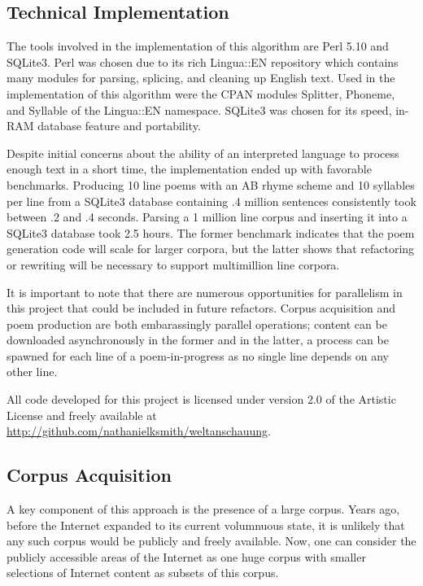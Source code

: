 \documentclass[10pt]{article}
\begin{document}
\subsection{Technical Implementation}
The tools involved in the implementation of this algorithm are Perl
5.10\cite{perl} and SQLite3\cite{sqlite3}. Perl was chosen due to its rich Lingua::EN
repository which contains many modules for parsing, splicing, and cleaning up
English text. Used in the implementation of this algorithm were the CPAN
modules Splitter\cite{splitter}, Phoneme\cite{phoneme}, and
Syllable\cite{syllable} of the Lingua::EN namespace. SQLite3 was
chosen for its speed, in-RAM database feature and portability.

Despite initial concerns about the ability of an interpreted language to
process enough text in a short time, the implementation ended up with favorable
benchmarks. Producing 10 line poems with an AB rhyme scheme and 10 syllables
per line from a SQLite3 database containing .4 million sentences consistently
took between .2 and .4 seconds. Parsing a 1 million line corpus and inserting
it into a SQLite3 database took 2.5 hours. The former benchmark indicates that
the poem generation code will scale for larger corpora, but the latter shows
that refactoring or rewriting will be necessary to support multimillion line
corpora.

It is important to note that there are numerous opportunities for parallelism
in this project that could be included in future refactors. Corpus acquisition
and poem production are both embarassingly parallel operations; content can be
downloaded asynchronously in the former and in the latter, a process can be
spawned for each line of a poem-in-progress as no single line depends on any
other line.

All code developed for this project is licensed under version 2.0 of the
Artistic License and freely available at
\url{http://github.com/nathanielksmith/weltanschauung}.

\subsection{Corpus Acquisition}
A key component of this approach is the presence of a large corpus. Years ago,
before the Internet expanded to its current volumnuous state, it is unlikely
that any such corpus would be publicly and freely available. Now, one can
consider the publicly accessible areas of the Internet as one huge corpus with
smaller selections of Internet content as subsets of this corpus.
\end{document}
